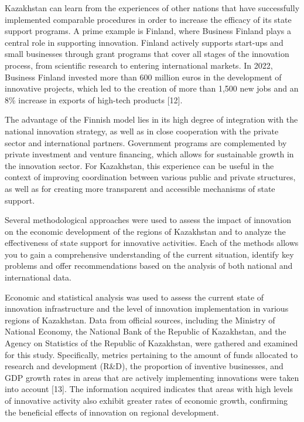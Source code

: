 Kazakhstan can learn from the experiences of other nations that have
successfully implemented comparable procedures in order to increase the
efficacy of its state support programs. A prime example is Finland,
where Business Finland plays a central role in supporting innovation.
Finland actively supports start-ups and small businesses through grant
programs that cover all stages of the innovation process, from
scientific research to entering international markets. In 2022, Business
Finland invested more than 600 million euros in the development of
innovative projects, which led to the creation of more than 1,500 new
jobs and an 8\% increase in exports of high-tech products {[}12{]}.

The advantage of the Finnish model lies in its high degree of
integration with the national innovation strategy, as well as in close
cooperation with the private sector and international partners.
Government programs are complemented by private investment and venture
financing, which allows for sustainable growth in the innovation sector.
For Kazakhstan, this experience can be useful in the context of
improving coordination between various public and private structures, as
well as for creating more transparent and accessible mechanisms of state
support.

Several methodological approaches were used to assess the impact of
innovation on the economic development of the regions of Kazakhstan and
to analyze the effectiveness of state support for innovative activities.
Each of the methods allows you to gain a comprehensive understanding of
the current situation, identify key problems and offer recommendations
based on the analysis of both national and international data.

Economic and statistical analysis was used to assess the current state
of innovation infrastructure and the level of innovation implementation
in various regions of Kazakhstan. Data from official sources, including
the Ministry of National Economy, the National Bank of the Republic of
Kazakhstan, and the Agency on Statistics of the Republic of Kazakhstan,
were gathered and examined for this study. Specifically, metrics
pertaining to the amount of funds allocated to research and development
(R\&D), the proportion of inventive businesses, and GDP growth rates in
areas that are actively implementing innovations were taken into account
{[}13{]}. The information acquired indicates that areas with high levels
of innovative activity also exhibit greater rates of economic growth,
confirming the beneficial effects of innovation on regional development.

